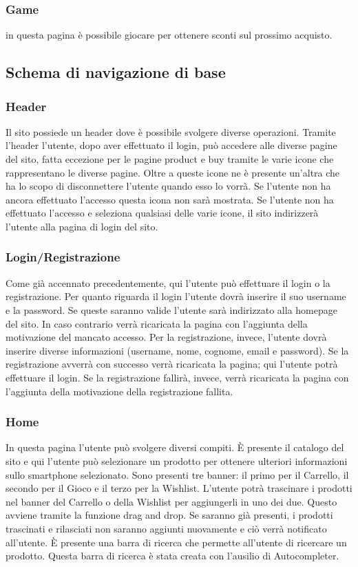 \documentclass[14pt]{extarticle}
\begin{document}
\subsubsection{Game}
in questa pagina è possibile giocare per ottenere sconti sul prossimo acquisto. 


\subsection{Schema di navigazione di base}
\subsubsection{Header}
Il sito possiede un header dove è possibile svolgere diverse operazioni. Tramite l'header l'utente,
dopo aver effettuato il login, può accedere alle diverse pagine del sito, fatta eccezione per le
pagine product e buy tramite le varie icone che rappresentano le diverse pagine. Oltre a queste
icone ne è presente un'altra che ha lo scopo di disconnettere l'utente quando esso lo vorrà. Se
l'utente non ha ancora effettuato l'accesso questa icona non sarà mostrata. Se l'utente non ha
effettuato l'accesso e seleziona qualsiasi delle varie icone, il sito indirizzerà l'utente alla pagina di
login del sito.


\subsubsection{Login/Registrazione}
Come già accennato precedentemente, qui l'utente può effettuare il login o la registrazione.
Per quanto riguarda il login l'utente dovrà inserire il suo username e la password. Se queste
saranno valide l'utente sarà indirizzato alla homepage del sito. In caso contrario verrà ricaricata la
pagina con l'aggiunta della motivazione del mancato accesso.
Per la registrazione, invece, l'utente dovrà inserire diverse informazioni (username, nome,
cognome, email e password). Se la registrazione avverrà con successo verrà ricaricata la pagina;
qui l'utente potrà effettuare il login. Se la registrazione fallirà, invece, verrà ricaricata la pagina con
l'aggiunta della motivazione della registrazione fallita.

\subsubsection{Home}
In questa pagina l'utente può svolgere diversi compiti.
È presente il catalogo del sito e qui l'utente può selezionare un prodotto per ottenere ulteriori
informazioni sullo smartphone selezionato.
Sono presenti tre banner: il primo per il Carrello, il secondo per il Gioco e il terzo per la Wishlist.
L'utente potrà trascinare i prodotti nel banner del Carrello o della Wishlist per aggiungerli in uno
dei due. Questo avviene tramite la funzione drag and drop. Se saranno già presenti, i prodotti
trascinati e rilasciati non saranno aggiunti nuovamente e ciò verrà notificato all'utente.
È presente una barra di ricerca che permette all'utente di ricercare un prodotto. Questa barra di
ricerca è stata creata con l'ausilio di Autocompleter.
\end{document}
